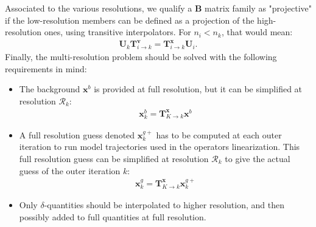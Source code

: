 \documentclass[npg, manuscript]{copernicus}
\begin{document}
Associated to the various resolutions, we qualify a $\mathbf{B}$ matrix family as "projective" if the low-resolution members can be defined as a projection of the high-resolution ones, using transitive interpolators. For $n_i < n_k$, that would mean:
\begin{align}
\label{eq:projective_definition_U}
\mathbf{U}_k \mathbf{T}^\mathbf{v}_{i \rightarrow k} = \mathbf{T}^\mathbf{x}_{i \rightarrow k} \mathbf{U}_i.
\end{align}
Finally, the multi-resolution problem should be solved with the following requirements in mind:
\begin{itemize}
\item The background $\mathbf{x}^b$ is provided at full resolution, but it can be simplified at resolution $\mathcal{R}_k$:
\begin{align}
\mathbf{x}^b_k = \mathbf{T}^\mathbf{x}_{K \rightarrow k} \mathbf{x}^b
\end{align}
\item A full resolution guess denoted $\mathbf{x}^{g+}_k$ has to be computed at each outer iteration to run model trajectories used in the operators linearization. This full resolution guess can be simplified at resolution $\mathcal{R}_k$ to give the actual guess of the outer iteration $k$:
\begin{align}
\mathbf{x}^g_k = \mathbf{T}^\mathbf{x}_{K \rightarrow k} \mathbf{x}^{g+}_k
\end{align}
\item Only $\delta$-quantities should be interpolated to higher resolution, and then possibly added to full quantities at full resolution.
\end{itemize}

\end{document}
